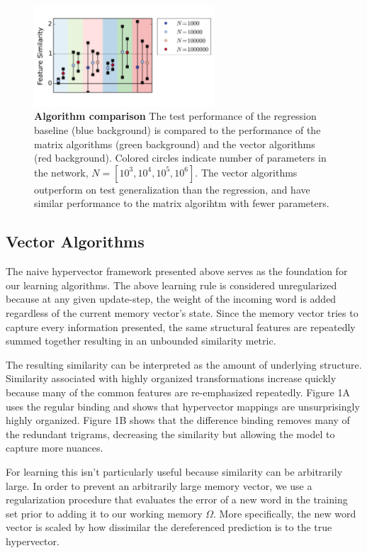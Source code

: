 \documentclass{article}
\begin{document}
\begin{figure}[h]
\centering
\includegraphics[width=0.6\textwidth]{algorithm_comparison-170519.png}
\caption{\textbf{Algorithm comparison} The test performance of the regression baseline (blue background) is compared to the performance of the matrix algorithms (green background) and the vector algorithms (red background). Colored circles indicate number of parameters in the network, $N=[10^3, 10^4, 10^5, 10^6]$. The vector algorithms outperform on test generalization than the regression, and have similar performance to the matrix algorihtm with fewer parameters.}
\end{figure}

\subsection{Vector Algorithms}

The naive hypervector framework presented above serves as the foundation for our learning algorithms. The above learning rule is considered unregularized because at any given update-step, the weight of the incoming word is added regardless of the current memory vector's state. Since the memory vector tries to capture every information presented, the same structural features are repeatedly summed together resulting in an unbounded similarity metric.

The resulting similarity can be interpreted as the amount of underlying structure. Similarity associated with highly organized transformations increase quickly because many of the common features are re-emphasized repeatedly. Figure 1A  uses the regular binding and shows that hypervector mappings are unsurprisingly highly organized. Figure 1B shows that the difference binding removes many of the redundant trigrams, decreasing the similarity but allowing the model to capture more nuances.

For learning this isn't particularly useful because similarity can be arbitrarily large. In order to prevent an arbitrarily large memory vector, we use a regularization procedure that evaluates the error of a new word in the training set prior to adding it to our working memory $\Omega$. More specifically, the new word vector is scaled by how dissimilar the dereferenced prediction is to the true hypervector.
\end{document}
